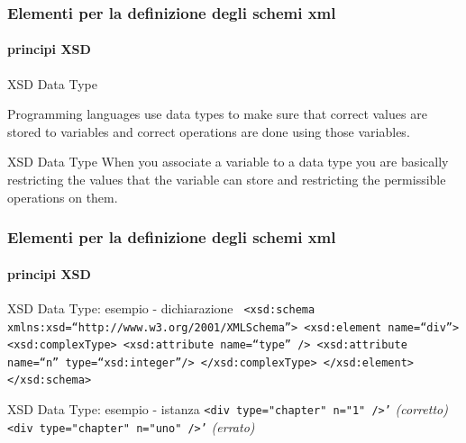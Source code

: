 \begin{frame}
	\frametitle{Elementi per la definizione degli schemi xml}
	\framesubtitle{principi XSD}
	\addtocounter{nframe}{1}

	\begin{block}{XSD Data Type}

		Programming languages use data types to make sure that correct values are stored to variables and correct operations are done using those variables.
	\end{block}

	\begin{block}{XSD Data Type}
		When you associate a variable to a data type you are basically restricting the values that the variable can store and restricting the permissible operations on them.
	\end{block}

\end{frame}

\begin{frame}
	\frametitle{Elementi per la definizione degli schemi xml}
	\framesubtitle{principi XSD}
	\addtocounter{nframe}{1}

	\begin{block}{XSD Data Type: esempio -  dichiarazione}
		\texttt{
			<xsd:schema xmlns:xsd=``http://www.w3.org/2001/XMLSchema''>
			<xsd:element name=``div''>
			<xsd:complexType>
			<xsd:attribute name=``type'' />
			<xsd:attribute name=``n'' type=``xsd:integer''/>
			</xsd:complexType>
			</xsd:element>
			</xsd:schema>
		}


	\end{block}

	\begin{block}{XSD Data Type: esempio - istanza}
		\texttt{<div type="chapter" n="1" />'} \textit{(corretto)}
		\\\texttt{<div type="chapter" n="uno" />'} \textit{(errato)}

	\end{block}



\end{frame}

